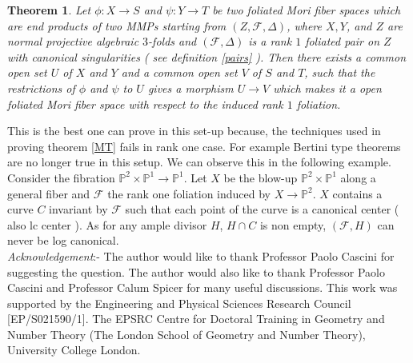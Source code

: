 \documentclass[12pt]{amsart}%
\theoremstyle{plain}
\newtheorem{theorem}{Theorem}[section]
\theoremstyle{remark}
\theoremstyle{definition}
\newcommand{\<}{\leq}
\def\mbP{\mathbb{P}}
\theoremstyle{definition}
\theoremstyle{definition}
\numberwithin{equation}{section}
\theoremstyle{remark}
\begin{document}
\begin{theorem}\label{MT2}
    Let $\phi:X\rightarrow S$ and $\psi:Y\rightarrow T$ be two foliated Mori fiber spaces which are end products of two MMPs starting from $(Z,\mathcal{F},\Delta)$, where $X,Y$, and $Z$ are normal projective algebraic $3$-folds and $(\mathcal{F},\Delta)$ is a rank $1$ foliated pair on $Z$ with canonical singularities ( see definition \ref{pairs} ). Then there exists a common open set $U$ of $X$ and $Y$ and a common open set $V$ of $S$ and $T$, such that the restrictions of $\phi$ and $\psi$ to $U$ gives a morphism $U\rightarrow V$ which makes it a open foliated Mori fiber space with respect to the induced rank $1$ foliation. 
\end{theorem}
This is the best one can prove in this set-up because, the techniques used in proving theorem \ref{MT} fails in rank one case. For example Bertini type theorems are no longer true in this setup. We can observe this in the following example. Consider the fibration $\mbP^2\times\mbP^1\rightarrow \mbP^1$. Let $X$ be the blow-up $\mbP^2\times \mbP^1$ along a general fiber and $\mathcal{F}$ the rank one foliation induced by $X\rightarrow \mbP^2$. $X$ contains a curve $C$ invariant by $\mathcal{F}$ such that each point of the curve is a canonical center ( also lc center ). As for any ample divisor $H$, $H\cap C$ is non empty, $(\mathcal{F},H)$ can never be log canonical. \\ 

\textit{Acknowledgement}:- The author would like to thank Professor Paolo Cascini for suggesting the question. The author would also like to thank Professor Paolo Cascini and Professor Calum Spicer for many useful discussions. This work was supported by the Engineering and Physical Sciences Research Council [EP/S021590/1]. The EPSRC Centre for Doctoral Training in Geometry and Number Theory (The London School of Geometry and Number Theory), University College London.
\end{document}
